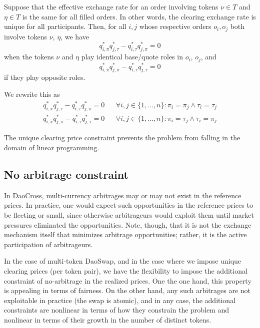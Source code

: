 \documentclass[11pt, reqno]{amsart}
\theoremstyle{definition}
\theoremstyle{remark}
\begin{document}
Suppose that the effective exchange rate for an order involving tokens
$\nu \in T$ and $\eta \in T$ is the same for all filled orders. In other words,
the clearing exchange rate is unique for all participants.
Then, for all $i, j$ whose respective orders $o_i, o_j$ both involve tokens
$\nu$, $\eta$, we have
\[
    q_{i, \pi}^* q_{j, \tau}^* - q_{i, \tau}^* q_{j, \pi}^* = 0
\]
when the tokens $\nu$ and $\eta$ play identical base/quote roles in $o_i$,
$o_j$, and
\[
    q_{i, \pi}^* q_{j, \pi}^* - q_{i, \tau}^* q_{j, \tau}^* = 0
\]
if they play opposite roles.

We rewrite this as
\begin{align*}
    q_{i, \pi}^* q_{j, \tau}^* - q_{i, \tau}^* q_{j, \pi}^* = 0 & & \forall i, j \in \{1, \ldots, n\}: \pi_i = \pi_j \land \tau_i = \tau_j \\
    q_{i, \pi}^* q_{j, \pi}^* - q_{i, \tau}^* q_{j, \tau}^* = 0 & & \forall i, j \in \{1, \ldots, n\}: \pi_i = \tau_j \land \tau_i = \pi_j
\end{align*}

The unique clearing price constraint prevents the problem from falling in the
domain of linear programming.




\subsection{No arbitrage constraint}
In DaoCross, multi-currency arbitrages may or may not exist in the reference
prices. In practice, one would expect such opportunities in the reference
prices to be fleeting or small, since otherwise arbitrageurs would exploit
them until market pressures eliminated the opportunities. Note, though, that
it is not the exchange mechanism itself that minimizes arbitrage opportunities;
rather, it is the active participation of arbitrageurs.

In the case of multi-token DaoSwap, and in the case where we impose unique
clearing prices (per token pair), we have the flexibility to impose the
additional constraint of no-arbitrage in the realized prices. One the one hand,
this property is appealing in terms of fairness. On the other hand, any such
arbitrages are not exploitable in practice (the swap is atomic), and in any
case, the additional constraints are nonlinear in terms of how they constrain
the problem and nonlinear in terms of their growth in the number of distinct
tokens.
\end{document}
